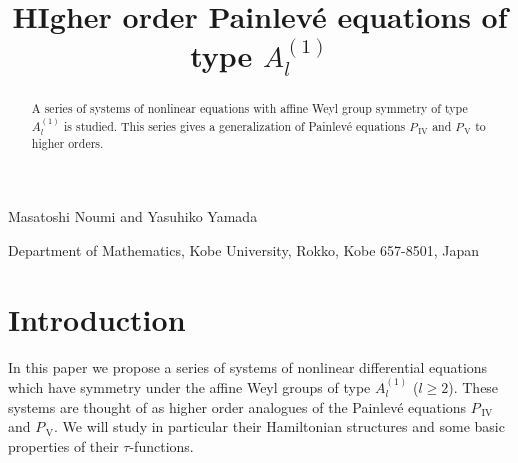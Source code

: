 

\theoremstyle{plain}
\newtheorem{thm}{Theorem}[section]
\newtheorem{prop}[thm]{Proposition}
\newtheorem{lem}[thm]{Lemma}
\newtheorem{cor}[thm]{Corollary}
\newtheorem{conj}[thm]{Conjecture}
\newtheorem{prob}[thm]{Problem}

\theoremstyle{definition}
\newtheorem{dfn}[thm]{Definition}
\newtheorem{ex}[thm]{Example}

\theoremstyle{remark}
\newtheorem{rem}[thm]{Remark}

\newcommand{\comment}[1]{}
\newcommand{\Label}[1]{\label{#1}}
\newcommand{\br}[1]{\langle #1 \rangle}
\newcommand{\Pbr}[1]{\big\{{ #1 }\big\}}
\newcommand{\contfrac}[2]{\dfrac{\hfill{#1}\hfill|}{|\hfill{#2}\hfill}}
\newcommand{\BZ}{{\Bbb Z}}
\newcommand{\BQ}{{\Bbb Q}}
\newcommand{\BR}{{\Bbb R}}
\newcommand{\BC}{{\Bbb C}}
\newcommand{\CK}{{\cal K}}

\title[\ ]{
HIgher order Painlev\'e equations of type $A^{(1)}_l$ 
}



\par\bigskip
\maketitle
\begin{center}
Masatoshi Noumi  
and 
Yasuhiko Yamada 
\end{center}

{\small
\begin{center}
Department of Mathematics, Kobe University, 
Rokko, Kobe 657-8501, Japan
\end{center}
}


\begin{abstract}
A series of systems of nonlinear equations with affine Weyl group symmetry 
of type $A^{(1)}_l$ is studied.  
This series gives a generalization of Painlev\'e equations $P_{\,\text{IV}}$
and $P_{\,\text{V}}$ to higher orders. 
\end{abstract}

\section*{Introduction}
In this paper we propose a series of systems of nonlinear differential equations 
which have symmetry under the affine Weyl groups of type $A^{(1)}_l$ ($l\ge 2$). 
These systems are thought of as higher order analogues of the Painlev\'e equations 
$P_{\,\text{IV}}$ and $P_{\,\text{V}}$.  
We will study in particular their Hamiltonian structures and 
some basic properties of their $\tau$-functions. 

